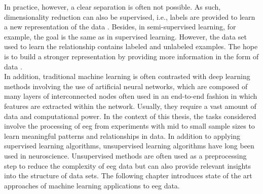\noindent In practice, however, a clear separation is often not possible. As such, dimensionality reduction can also be supervised, i.e., labels are provided to learn a new representation of the data \cite{mcinnes2018umap}. Besides, in semi-supervised learning, for example, the goal is the same as in supervised learning. However, the data set used to learn the relationship contains labeled and unlabeled examples. The hope is to build a stronger representation by providing more information in the form of data \cite{Burkov2019}. \\
In addition, traditional machine learning is often contrasted with deep learning methods involving the use of artificial neural networks, which are composed of many layers of interconnected nodes often used in an end-to-end fashion in which features are extracted within the network. Usually, they require a vast amount of data and computational power. In the context of this thesis, the tasks considered involve the processing of \gls{eeg} from experiments with mid to small sample sizes to learn meaningful patterns and relationships in data. In addition to applying supervised learning algorithms, unsupervised learning algorithms have long been used in neuroscience. Unsupervised methods are often used as a preprocessing step to reduce the complexity of \gls{eeg} data but can also provide relevant insights into the structure of data sets. The following chapter introduces state of the art approaches of machine learning applications to \gls{eeg} data.

